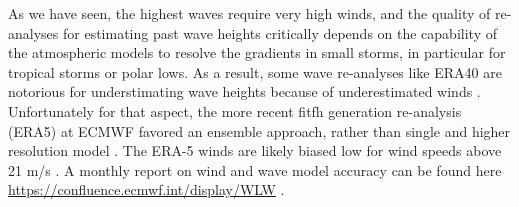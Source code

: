 As we have seen, the highest waves require very high winds, and the quality of re-analyses for estimating past wave heights critically depends 
on the capability of the atmospheric models to resolve the gradients in small storms, in particular for tropical storms or polar lows. As a result, some wave re-analyses like ERA40 are notorious for understimating 
wave heights because of underestimated winds \citep{Caires&Sterl2005}. Unfortunately for that aspect, the more recent fitfh generation re-analysis (ERA5) at ECMWF 
favored an ensemble approach, rather than single and higher resolution model \citep{Hersbach&al.2020}. The ERA-5 winds are likely biased low for wind speeds above 21 m/s \citep{Pineau-Guillou&al.2018}. A monthly report on wind and wave model accuracy can be found here \url{https://confluence.ecmwf.int/display/WLW} .
 

